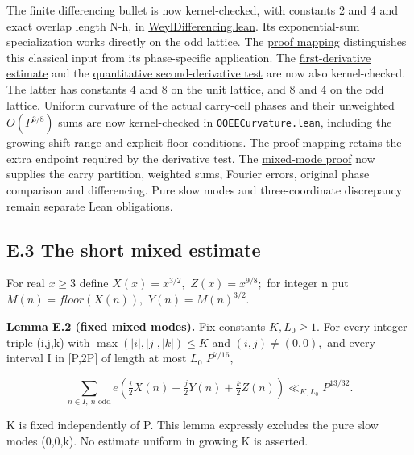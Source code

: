 \documentclass[11pt,a4paper]{article}
\begin{document}
The finite differencing bullet is now kernel-checked, with constants 2
and 4 and exact overlap length N-h, in
\href{../../formal/BTCalculus/WeylDifferencing.lean}{WeylDifferencing.lean}.
Its exponential-sum specialization works directly on the odd lattice.
The
\href{https://github.com/sneakyweasel/btlab/blob/main/docs/theory/finite_weyl_differencing_note.md}{proof
mapping} distinguishes this classical input from its phase-specific
application. The
\href{https://github.com/sneakyweasel/btlab/blob/main/docs/theory/first_derivative_power_cancellation_note.md}{first-derivative
estimate} and the
\href{https://github.com/sneakyweasel/btlab/blob/main/docs/theory/second_derivative_cancellation_note.md}{quantitative
second-derivative test} are now also kernel-checked. The latter has
constants 4 and 8 on the unit lattice, and 8 and 4 on the odd lattice.
Uniform curvature of the actual carry-cell phases and their unweighted
\(O(P^{3/8})\) sums are now kernel-checked in
\texttt{\nolinkurl{OOEECurvature.lean}}, including the growing shift
range and explicit floor conditions. The
\href{https://github.com/sneakyweasel/btlab/blob/main/docs/theory/juggler_ooee_curvature_note.md}{proof
mapping} retains the extra endpoint required by the derivative test. The
\href{https://github.com/sneakyweasel/btlab/blob/main/docs/theory/juggler_ooee_mixed_modes_note.md}{mixed-mode
proof} now supplies the carry partition, weighted sums, Fourier errors,
original phase comparison and differencing. Pure slow modes and
three-coordinate discrepancy remain separate Lean obligations.

\subsection{E.3 The short mixed
estimate}\label{e.3-the-short-mixed-estimate}

For real \(x\ge 3\) define \(X(x)=x^{3/2},\) \(Z(x)=x^{9/8};\) for
integer n put \(M(n)=floor(X(n)),\) \(Y(n)=M(n)^{3/2}.\)

\textbf{Lemma E.2 (fixed mixed modes).} Fix constants \(K,L_0\ge 1.\)
For every integer triple (i,j,k) with \(\max(|i|,|j|,|k|)\le K\) and
\((i,j)\ne (0,0),\) and every interval I in {[}P,2P{]} of length at most
\(L_0\) \(P^{7/16},\)

\[
 \sum_{n\in I,\ n\text{ odd}}
 e\left(\tfrac i2 X(n)+\tfrac j2 Y(n)+\tfrac k2 Z(n)\right)
       \ll_{K,L_0} P^{13/32}.
 \tag{E.5}
\]

K is fixed independently of P. This lemma expressly excludes the pure
slow modes (0,0,k). No estimate uniform in growing K is asserted.
\end{document}
